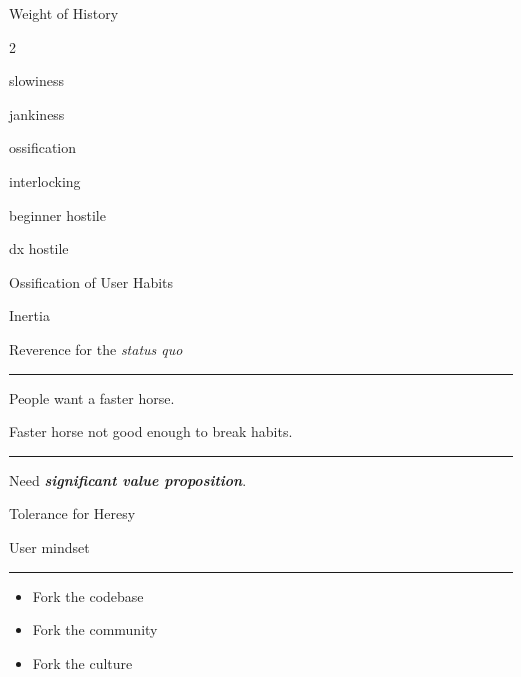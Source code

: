 \documentclass{beamer}
\begin{document}
\begin{frame}{Weight of History}

	\begin{itemize}


	\end{itemize}

\end{frame}


\begin{frame}[standout]

	Ossification of User Habits

\end{frame}


\begin{frame}{Inertia}

	Reverence for the \textit{status quo}

	\rule{\textwidth}{0.1em}

	People want a faster horse.

	Faster horse not good enough to break habits.

	\rule{\textwidth}{0.1em}

	Need \textbf{\textit{significant value proposition}}.

\end{frame}


\begin{frame}{Tolerance for Heresy}

	User mindset

	\rule{\textwidth}{0.1em}

	\begin{itemize}

		\item Fork the codebase

		\item Fork the community

		\item Fork the culture

	\end{itemize}

\end{frame}
\end{document}
